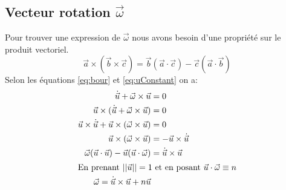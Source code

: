\documentclass[12pt,a4paper]{article}
\begin{document}
\subsection*{Vecteur rotation $\vec{\omega}$}
\label{subsec:omega}
Pour trouver une expression de $\vec{\omega}$ nous avons besoin d'une propriété sur le produit vectoriel.
\begin{equation}
	\vec{a}\times(\vec{b}\times\vec{c})=\vec{b}(\vec{a}\cdot\vec{c})-\vec{c}(\vec{a}\cdot\vec{b})
\end{equation}
Selon les équations \eqref{eq:bour} et \eqref{eq:uConstant} on a:
\begin{align*}
\dot{\vec{u}}+\vec{\omega}\times\vec{u}									&=	0\\
\vec{u}\times(\dot{\vec{u}}+\vec{\omega}\times\vec{u})					&=	0\\
\vec{u}\times\dot{\vec{u}}+\vec{u}\times(\vec{\omega}\times\vec{u})		&=	0\\
\vec{u}\times(\vec{\omega}\times\vec{u})								&=-\vec{u}\times\dot{\vec{u}}\\
\vec{\omega}(\vec{u}\cdot\vec{u})-\vec{u}(\vec{u}\cdot\vec{\omega})		&=\dot{\vec{u}}\times\vec{u}\\
\intertext{En prenant $||\vec{u}||=1$ et en posant $\vec{u}\cdot\vec{\omega}\equiv n$}
\vec{\omega}=\dot{\vec{u}}\times\vec{u}+n\vec{u}
\end{align*}
\end{document}
